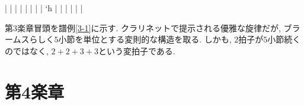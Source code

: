 \musicbegin
	\def\nbinstruments{1}%
	\startextract%
		\Notes\cmidstaff{\p}|
			\enotes
		\Notes{}|
			\enotes
		\bar
		\NOtes{}|
			\enotes
		\bar
		\NOtes{}|
			\enotes
		\bar
		\Notes{}|
			\lq{h}\enotes
		\Notes{}|
			\enotes
		\bar
		\Notes{}|
			\enotes
		\Notes{}|
			\enotes
		\Notes{}|
			\enotes
		\Notes{}|
			\enotes
	\endextract %

第3楽章冒頭を譜例\ref{3-1}に示す. クラリネットで提示される優雅な旋律だが, ブラームスらしく$5$小節を単位とする変則的な構造を取る.
しかも, $2$拍子が$5$小節続くのではなく, $2 + 2 + 3 + 3$という変拍子である.


\section{第4楽章}
